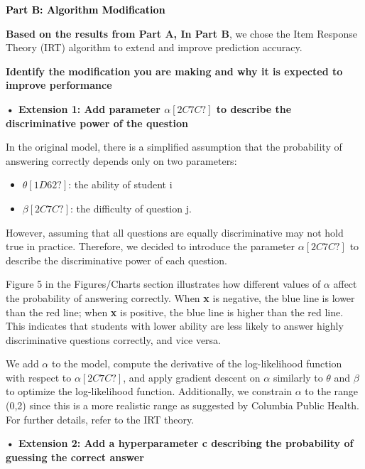 \documentclass[letterpaper]{article}
\begin{document}
\bigskip

\clearpage
\textbf{\textcolor{black}{Part B: Algorithm Modification}}

\textbf{Based on the results from Part A, In Part B}, we chose the Item Response Theory (IRT) algorithm to extend and
improve prediction accuracy.


\bigskip

\textbf{Identify the modification you are making and why it is expected to improve performance}


\bigskip

\textbf{• Extension 1: Add parameter $\alpha [2C7C?]$ to describe the discriminative power of the question}

In the original model, there is a simplified assumption that the probability of answering correctly depends only on two
parameters:

\begin{itemize}[series=listWWNumx,label=[F0B7?]]
\item \textbf{$\theta [1D62?]$}: the ability of student i
\item \textbf{$\beta [2C7C?]$}: the difficulty of question j.
\end{itemize}
However, assuming that all questions are equally discriminative may not hold true in practice. Therefore, we decided to
introduce the parameter \textbf{$\alpha [2C7C?]$} to describe the discriminative power of each question.

Figure 5 in the Figures/Charts section illustrates how different values of \textbf{$\alpha $} affect the probability of
answering correctly. When \textbf{x} is negative, the blue line is lower than the red line; when \textbf{x} is
positive, the blue line is higher than the red line. This indicates that students with lower ability are less likely to
answer highly discriminative questions correctly, and vice versa.

We add \textbf{$\alpha $} to the model, compute the derivative of the log-likelihood function with respect to
\textbf{$\alpha [2C7C?]$}, and apply gradient descent on \textbf{$\alpha $} similarly to \textbf{$\theta $} and
\textbf{$\beta $} to optimize the log-likelihood function. Additionally, we constrain \textbf{$\alpha $} to the range
(0,2) since this is a more realistic range as suggested by Columbia Public Health. For further details, refer to the
IRT theory.

\textbf{• Extension 2: Add a hyperparameter c describing the probability of guessing the correct answer}
\end{document}
